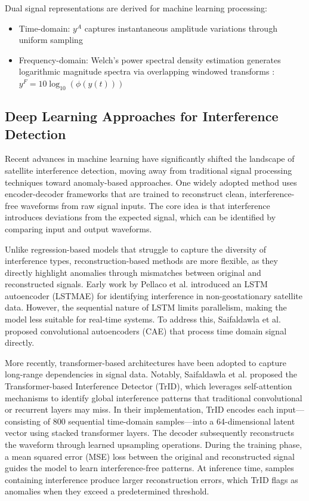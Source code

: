 \documentclass[conference]{IEEEtran}
\begin{document}
Dual signal representations are derived for machine learning processing:
\begin{itemize}
    \item Time-domain: $y^A$ captures instantaneous amplitude variations through uniform sampling
    \item Frequency-domain: Welch's power spectral density estimation generates logarithmic magnitude spectra via overlapping windowed transforms \cite{saifaldawlaGenAIBasedModelsNGSO2024}: $y^F = 10\log_{10}(\phi(y(t)))$
\end{itemize}



\subsection{Deep Learning Approaches for Interference Detection}
\label{ssec:related_works}

Recent advances in machine learning have significantly shifted the landscape of satellite interference detection, moving away from traditional signal processing techniques toward anomaly-based approaches. One widely adopted method uses encoder-decoder frameworks that are trained to reconstruct clean, interference-free waveforms from raw signal inputs. The core idea is that interference introduces deviations from the expected signal, which can be identified by comparing input and output waveforms.

Unlike regression-based models that struggle to capture the diversity of interference types, reconstruction-based methods are more flexible, as they directly highlight anomalies through mismatches between original and reconstructed signals. Early work by Pellaco et al. \cite{pellacoSpectrumPredictionInterference2019} introduced an LSTM autoencoder (LSTMAE) for identifying interference in non-geostationary satellite data. However, the sequential nature of LSTM limits parallelism, making the model less suitable for real-time systems. To address this, Saifaldawla et al. \cite{saifaldawlaConvolutionalAutoencodersNonGeostationary2024} proposed convolutional autoencoders (CAE) that process time domain signal directly.

More recently, transformer-based architectures have been adopted to capture long-range dependencies in signal data. Notably, Saifaldawla et al. \cite{saifaldawlaGenAIBasedModelsNGSO2024} proposed the Transformer-based Interference Detector (TrID), which leverages self-attention mechanisms to identify global interference patterns that traditional convolutional or recurrent layers may miss. In their implementation, TrID encodes each input—consisting of 800 sequential time-domain samples—into a 64-dimensional latent vector using stacked transformer layers. The decoder subsequently reconstructs the waveform through learned upsampling operations. During the training phase, a mean squared error (MSE) loss between the original and reconstructed signal guides the model to learn interference-free patterns. At inference time, samples containing interference produce larger reconstruction errors, which TrID flags as anomalies when they exceed a predetermined threshold.
\end{document}
